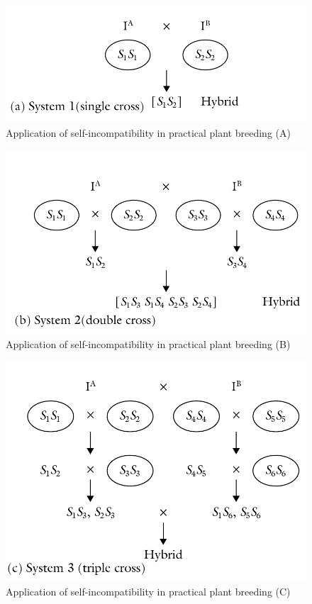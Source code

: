 \documentclass[11pt,ignorenonframetext,aspectratio=169]{beamer}
\begin{document}
\begin{frame}{}
\protect\hypertarget{section-9}{}
\begin{figure}

{\centering \includegraphics[width=0.5\linewidth]{./images/incompatibility_use_SC} 

}

\caption{Application of self-incompatibility in practical plant breeding (A)}\label{fig:si-use-sc}
\end{figure}
\end{frame}

\begin{frame}{}
\protect\hypertarget{section-10}{}
\begin{figure}

{\centering \includegraphics[width=0.5\linewidth]{./images/incompatibility_use_DC} 

}

\caption{Application of self-incompatibility in practical plant breeding (B)}\label{fig:si-use-dc}
\end{figure}
\end{frame}

\begin{frame}{}
\protect\hypertarget{section-11}{}
\begin{figure}

{\centering \includegraphics[width=0.5\linewidth]{./images/incompatibility_use_TC} 

}

\caption{Application of self-incompatibility in practical plant breeding (C)}\label{fig:si-use-tc}
\end{figure}
\end{frame}
\end{document}
